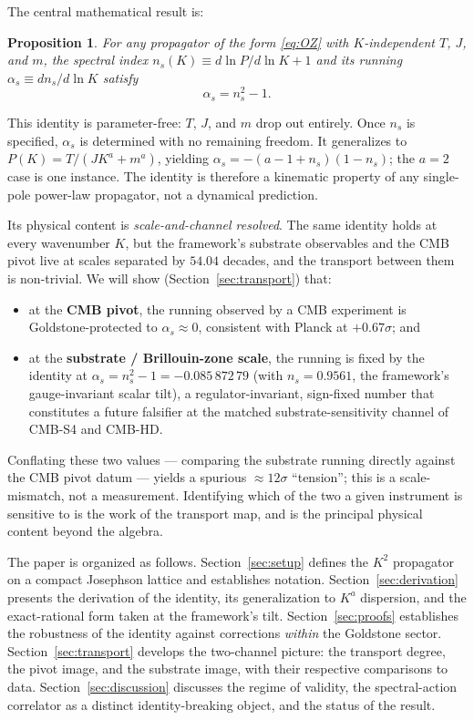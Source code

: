 \documentclass[12pt]{article}
\newtheorem{proposition}[theorem]{Proposition}
\theoremstyle{definition}
\theoremstyle{remark}
\begin{document}
The central mathematical result is:

\begin{proposition}\label{prop:main}
For any propagator of the form \eqref{eq:OZ} with $K$-independent $T$, $J$, and $m$, the spectral index $n_s(K) \equiv d\ln P/d\ln K + 1$ and its running $\alpha_s \equiv dn_s/d\ln K$ satisfy
\begin{equation}\label{eq:identity}
  \alpha_s = n_s^2 - 1.
\end{equation}
\end{proposition}

This identity is parameter-free: $T$, $J$, and $m$ drop out entirely. Once $n_s$ is specified, $\alpha_s$ is determined with no remaining freedom. It generalizes to $P(K) = T/(JK^a + m^a)$, yielding $\alpha_s = -(a - 1 + n_s)(1 - n_s)$; the $a = 2$ case is one instance. The identity is therefore a kinematic property of any single-pole power-law propagator, not a dynamical prediction.

Its physical content is \emph{scale-and-channel resolved}. The same identity holds at every wavenumber $K$, but the framework's substrate observables and the CMB pivot live at scales separated by $54.04$ decades, and the transport between them is non-trivial. We will show (Section~\ref{sec:transport}) that:
\begin{itemize}
  \item at the \textbf{CMB pivot}, the running observed by a CMB experiment is Goldstone-protected to $\alpha_s \approx 0$, consistent with Planck at $+0.67\sigma$; and
  \item at the \textbf{substrate / Brillouin-zone scale}, the running is fixed by the identity at $\alpha_s = n_s^2 - 1 = -0.085\,872\,79$ (with $n_s = 0.9561$, the framework's gauge-invariant scalar tilt), a regulator-invariant, sign-fixed number that constitutes a future falsifier at the matched substrate-sensitivity channel of CMB-S4 and CMB-HD.
\end{itemize}
Conflating these two values --- comparing the substrate running directly against the CMB pivot datum --- yields a spurious $\approx 12\sigma$ ``tension''; this is a scale-mismatch, not a measurement. Identifying which of the two a given instrument is sensitive to is the work of the transport map, and is the principal physical content beyond the algebra.

The paper is organized as follows. Section~\ref{sec:setup} defines the $K^2$ propagator on a compact Josephson lattice and establishes notation. Section~\ref{sec:derivation} presents the derivation of the identity, its generalization to $K^a$ dispersion, and the exact-rational form taken at the framework's tilt. Section~\ref{sec:proofs} establishes the robustness of the identity against corrections \emph{within} the Goldstone sector. Section~\ref{sec:transport} develops the two-channel picture: the transport degree, the pivot image, and the substrate image, with their respective comparisons to data. Section~\ref{sec:discussion} discusses the regime of validity, the spectral-action correlator as a distinct identity-breaking object, and the status of the result.
\end{document}
